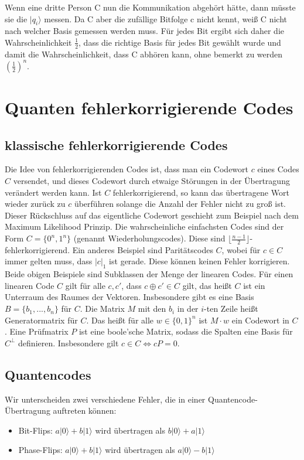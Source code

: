 \documentclass[a4paper, 12pt]{article}
\theoremstyle{plain}
\theoremstyle{definition}
\theoremstyle{lemma}
\theoremstyle{remark}
\theoremstyle{example}
\begin{document}
	Wenn eine dritte Person C nun die Kommunikation abgehört hätte, dann müsste sie die $|q_i\rangle$ messen. Da C aber die zufällige Bitfolge c nicht kennt, weiß C nicht nach welcher Basis gemessen werden muss. Für jedes Bit ergibt sich daher die Wahrscheinlichkeit $\frac{1}{2}$, dass die richtige Basis für jedes Bit gewählt wurde und damit die Wahrscheinlichkeit, dass C abhören kann, ohne bemerkt zu werden $\left(\frac{1}{2}\right)^n$. 
	\section{Quanten fehlerkorrigierende Codes}
	\subsection{klassische fehlerkorrigierende Codes}
	Die Idee von fehlerkorrigierenden Codes ist, dass man ein Codewort $c$ eines Codes $C$ versendet, und dieses Codewort durch etwaige Störungen in der Übertragung verändert werden kann. Ist $C$ fehlerkorrigierend, so kann das übertragene Wort wieder zurück zu $c$ überführen solange die Anzahl der Fehler nicht zu groß ist. Dieser Rückschluss auf das eigentliche Codewort geschieht zum Beispiel nach dem Maximum Likelihood Prinzip. Die wahrscheinliche einfachsten Codes sind der Form $C = \{0^n,1^n\}$ (genannt Wiederholungscodes). Diese sind $\lfloor\frac{n-1}{2}\rfloor$-fehlerkorrigierend. Ein anderes Beispiel sind Paritätscodes $C$, wobei für $c \in C$ immer gelten muss, dass $\left|c\right|_1$ ist gerade. Diese können keinen Fehler korrigieren.\\
	Beide obigen Beispiele sind Subklassen der Menge der linearen Codes. Für einen linearen Code $C$ gilt für alle $c,c'$, dass $c\oplus c' \in C$ gilt, das heißt $C$ ist ein Unterraum des Raumes der Vektoren. Insbesondere gibt es eine Basis $B = \{b_1,...,b_n\}$ für $C$. Die Matrix $M$ mit den $b_i$ in der $i$-ten Zeile heißt Generatormatrix für $C$. Das heißt für alle $w \in \{0,1\}^n$ ist $M\cdot w$ ein Codewort in $C$. Eine Prüfmatrix $P$ ist eine boole'sche Matrix, sodass die Spalten eine Basis für $C^\bot$ definieren. Insbesondere gilt $c \in C \iff cP = 0$.
	\subsection{Quantencodes}
	Wir unterscheiden zwei verschiedene Fehler, die in einer Quantencode-Übertragung auftreten können: \begin{itemize}
		\item Bit-Flips: $a|0\rangle + b|1\rangle$ wird übertragen als $b|0\rangle + a|1\rangle$
		\item Phase-Flips: $a|0\rangle + b|1\rangle$ wird übertragen als $a|0\rangle - b|1\rangle$
	\end{itemize}
\end{document}
